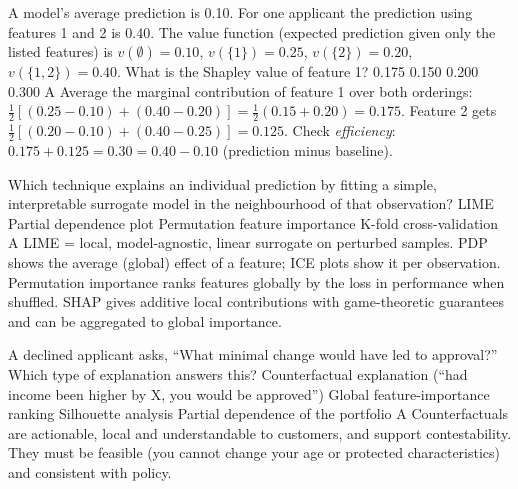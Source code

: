 {A model's average prediction is 0.10. For one applicant the prediction using features 1 and 2 is 0.40. The value function (expected prediction given only the listed features) is $v(\emptyset)=0.10$, $v(\{1\})=0.25$, $v(\{2\})=0.20$, $v(\{1,2\})=0.40$. What is the Shapley value of feature 1?}
{0.175}
{0.150}
{0.200}
{0.300}
{A}
{Average the marginal contribution of feature 1 over both orderings: $\tfrac12[(0.25-0.10)+(0.40-0.20)]=\tfrac12(0.15+0.20)=0.175$. Feature 2 gets $\tfrac12[(0.20-0.10)+(0.40-0.25)]=0.125$. Check \emph{efficiency}: $0.175+0.125=0.30=0.40-0.10$ (prediction minus baseline).}

{Which technique explains an individual prediction by fitting a simple, interpretable surrogate model in the neighbourhood of that observation?}
{LIME}
{Partial dependence plot}
{Permutation feature importance}
{K-fold cross-validation}
{A}
{LIME = local, model-agnostic, linear surrogate on perturbed samples. PDP shows the average (global) effect of a feature; ICE plots show it per observation. Permutation importance ranks features globally by the loss in performance when shuffled. SHAP gives additive local contributions with game-theoretic guarantees and can be aggregated to global importance.}

{A declined applicant asks, ``What minimal change would have led to approval?'' Which type of explanation answers this?}
{Counterfactual explanation (``had income been higher by X, you would be approved'')}
{Global feature-importance ranking}
{Silhouette analysis}
{Partial dependence of the portfolio}
{A}
{Counterfactuals are actionable, local and understandable to customers, and support contestability. They must be feasible (you cannot change your age or protected characteristics) and consistent with policy.}

